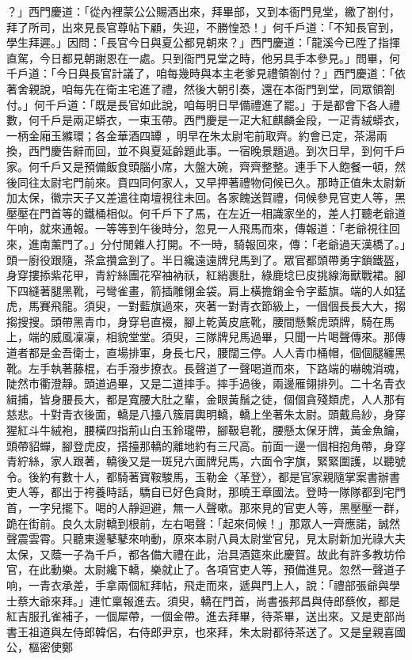 ？」西門慶道：「從內裡蒙公公賜酒出來，拜畢部，又到本衙門見堂，繳了劄付，拜了所司，出來見長官尊帖下顧，失迎，不勝惶恐！」何千戶道：「不知長官到，學生拜遲。」因問：「長官今日與夏公都見朝來？」西門慶道：「龍溪今已陞了指揮直駕，今日都見朝謝恩在一處。只到衙門見堂之時，他另具手本參見。」問畢，何千戶道：「今日與長官計議了，咱每幾時與本主老爹見禮領劄付？」西門慶道：「依著舍親說，咱每先在衛主宅進了禮，然後大朝引奏，還在本衙門到堂，同眾領劄付。」何千戶道：「既是長官如此說，咱每明日早備禮進了罷。」于是都會下各人禮數，何千戶是兩疋蟒衣，一束玉帶。西門慶是一疋大紅麒麟金段，一疋青絨蟒衣，一柄金廂玉縧環；各金華酒四罈 ，明早在朱太尉宅前取齊。約會已定，茶湯兩換，西門慶告辭而回，並不與夏延齡題此事。一宿晚景題過。到次日早，到何千戶家。何千戶又是預備飯食頭腦小席，大盤大碗，齊齊整整。連手下人飽餐一頓，然後同往太尉宅門前來。賁四同何家人，又早押著禮物伺候已久。那時正值朱太尉新加太保，徽宗天子又差遣往南壇視往未回。各家餽送賀禮，伺候參見官吏人等，黑壓壓在門首等的鐵桶相似。何千戶下了馬，在左近一相識家坐的，差人打聽老爺道午响，就來通報。一等等到午後時分，忽見一人飛馬而來，傳報道：「老爺視往回來，進南薰門了。」分付閒雜人打開。不一時，騎報回來，傳：「老爺過天漢橋了。」頭一廚役跟隨，茶盒攢盒到了。半日纔遠遠牌兒馬到了。眾官都頭帶勇字鎖鐵盔，身穿摟掭紫花甲，青紵絲團花窄袖衲祅，紅綃裹肚，綠鹿埝巳皮挑線海獸戰裙。腳下四縫著腿黑靴，弓彎雀畫，箭插雕翎金袋。肩上橫擔銷金令字藍旗。端的人如猛虎，馬賽飛龍。須臾，一對藍旗過來，夾著一對青衣節級上，一個個長長大大，搊搊搜搜。頭帶黑青巾，身穿皂直裰，腳上乾黃皮底靴，腰間懸繫虎頭牌，騎在馬上，端的威風凜凜，相貌堂堂。須臾，三隊牌兒馬過畢，只聞一片喝聲傳來。那傳道者都是金吾衛士，直場排軍，身長七尺，腰闊三停。人人青巾桶帽，個個腿纏黑靴。左手執著藤棍，右手潑步撩衣。長聲道了一聲喝道而來，下路端的嚇魄消魂，陡然市衢澄靜。頭道過畢，又是二道摔手。摔手過後，兩邊雁翎排列。二十名青衣緝捕，皆身腰長大，都是寬腰大肚之輩，金眼黃鬚之徒，個個貪殘類虎，人人那有慈悲。十對青衣後面，轎是八擡八簇肩輿明轎，轎上坐著朱太尉。頭戴烏紗，身穿猩紅斗牛絨袍，腰橫四指荊山白玉鈴瓏帶，腳靸皂靴，腰懸太保牙牌，黃金魚鑰，頭帶貂蟬，腳登虎皮，搭擡那轎的離地約有三尺高。前面一邊一個相抱角帶，身穿青紵絲，家人跟著，轎後又是一斑兒六面牌兒馬，六面令字旗，緊緊圍護，以聽號令。後約有數十人，都騎著寶鞍駿馬，玉勒金〈革登〉，都是官家親隨掌案書辦書吏人等，都出于袴養時話，驕自已好色貪財，那曉王章國法。登時一隊隊都到宅門首，一字兒擺下。喝的人靜迴避，無一人聲嗽。那來見的官吏人等，黑壓壓一群，跪在街前。良久太尉轎到根前，左右喝聲：「起來伺候！」那眾人一齊應諾，誠然聲震雲霄。只聽東邊鼕鼕來响動，原來本尉八員太尉堂官兒，見太尉新加光祿大夫太保，又蔭一子為千戶，都各備大禮在此，治具酒筵來此慶賀。故此有許多教坊伶官，在此動樂。太尉纔下轎，樂就止了。各項官吏人等，預備進見。忽然一聲道子响，一青衣承差，手拿兩個紅拜帖，飛走而來，遞與門上人，說：「禮部張爺與學士蔡大爺來拜。」連忙稟報進去。須臾，轎在門首，尚書張邦昌與侍郎蔡攸，都是紅吉服孔雀補子，一個犀帶，一個金帶。進去拜畢，待茶畢，送出來。又是吏部尚書王祖道與左侍郎韓侶，右侍郎尹京，也來拜，朱太尉都待茶送了。又是皇親喜國公，樞密使鄭